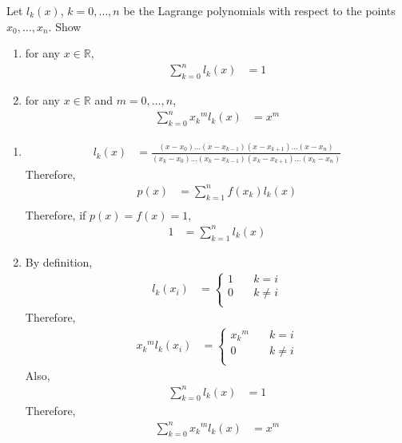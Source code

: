 \documentclass[fleqn, a4paper, 11pt, oneside]{amsart}
\theoremstyle{definition}
\theoremstyle{theorem}
\begin{document}
\begin{question}
	Let $l_k(x)$, $k = 0,\dots,n$ be the Lagrange polynomials with respect to the points $x_0,\dots,x_n$.
	Show
	\begin{enumerate}
		\item
			for any $x \in \mathbb{R}$,
			\begin{align*}
				\sum\limits_{k = 0}^{n} l_k(x) &= 1
			\end{align*}
		\item
			for any $x \in \mathbb{R}$ and $m = 0,\dots,n$,
			\begin{align*}
				\sum\limits_{k = 0}^{n} {x_k}^m l_k(x) &= x^m
			\end{align*}
	\end{enumerate}
\end{question}

\begin{solution}
	\begin{enumerate}[leftmargin=*]
		\item
			\begin{align*}
				l_k(x) &= \frac{(x - x_0) \dots (x - x_{k - 1}) (x - x_{k + 1}) \dots (x - x_n)}{(x_k - x_0) \dots (x_k - x_{k - 1}) (x_k - x_{k + 1}) \dots (x_k - x_n)}
			\end{align*}
			Therefore,
			\begin{align*}
				p(x) &= \sum\limits_{k = 1}^{n} f(x_k) l_k(x)\\
			\end{align*}
			Therefore, if $p(x) = f(x) = 1$,
			\begin{align*}
				1 &= \sum\limits_{k = 1}^{n} l_k(x)
			\end{align*}
		\item
			By definition,
			\begin{align*}
				l_k(x_i) &=
					\begin{cases}
						1 &\quad k = i\\
						0 &\quad k \neq i\\
					\end{cases}
			\end{align*}
			Therefore,
			\begin{align*}
				{x_k}^m l_k(x_i) &=
					\begin{cases}
						{x_k}^m &\quad k = i\\
						0 &\quad k \neq i\\
					\end{cases}
			\end{align*}
			Also,
			\begin{align*}
				\sum\limits_{k = 0}^{n} l_k(x) &= 1
			\end{align*}
			Therefore,
			\begin{align*}
				\sum\limits_{k = 0}^{n} {x_k}^m l_k(x) &= x^m
			\end{align*}
	\end{enumerate}
\end{solution}
\end{document}
